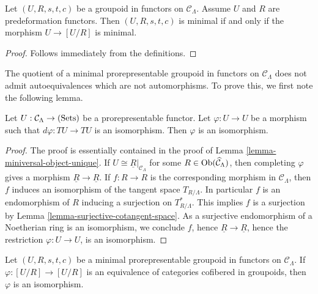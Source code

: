 \begin{lemma}
\label{lemma-characterize-minimal-groupoid-in-functors}
Let $(U, R, s,t,c)$ be a groupoid in functors on $\mathcal C_{\Lambda}$.  
Assume $U$ and $R$ are predeformation functors.  Then $(U,R,s,t,c)$ is minimal 
if and only if the morphism $U \rightarrow [U/R]$ is minimal.
\end{lemma}

\begin{proof}
Follows immediately from the definitions.
\end{proof}

\noindent
The quotient of a minimal prorepresentable groupoid in functors on $\mathcal 
C_{\Lambda}$ does not admit autoequivalences which are not automorphisms.  To 
prove this, we first note the following lemma.

\begin{lemma}
\label{lemma-surjective-morphism-prorepresentable-functor}
Let $U: \mathcal C_{\Lambda} \rightarrow \textnormal{(Sets)}$ be a 
prorepresentable functor.  Let $\varphi: U \rightarrow U$ be a morphism such 
that $d\varphi: TU \rightarrow TU$ is an isomorphism.  Then $\varphi$ is an 
isomorphism.
\end{lemma}

\begin{proof}
The proof is essentially contained in the proof of Lemma 
\ref{lemma-miniversal-object-unique}. If $U \cong \underline{R}|_{\mathcal 
C_{\Lambda}}$ for some $R \in \textnormal{Ob}(\widehat{\mathcal C}_{\Lambda})$, 
then completing $\varphi$ gives a morphism $\underline{R} \rightarrow 
\underline{R}$.  If $f: R \rightarrow R$ is the corresponding morphism in 
$\mathcal C_{\Lambda}$, then $f$ induces an isomorphism of the tangent space 
$T_{R/\Lambda}$.  In particular $f$ is an endomorphism of $R$ inducing a 
surjection on $T^*_{R/\Lambda}$.  This implies $f$ is a surjection by Lemma 
\ref{lemma-surjective-cotangent-space}. As a surjective endomorphism of a 
Noetherian ring is an isomorphism, we conclude $f$, hence $\underline{R} 
\rightarrow \underline{R}$, hence the restriction $\varphi: U \rightarrow U$, 
is an isomorphism.
\end{proof}

\begin{lemma}
\label{lemma-minimal-prorepresentable-groupoid-autoequivalence}
Let $(U,R,s,t,c)$ be a minimal prorepresentable groupoid in functors on 
$\mathcal C_{\Lambda}$.  If $\varphi: [U/R] \rightarrow [U/R]$ is an 
equivalence of categories cofibered in groupoids, then $\varphi$ is an 
isomorphism.
\end{lemma}


